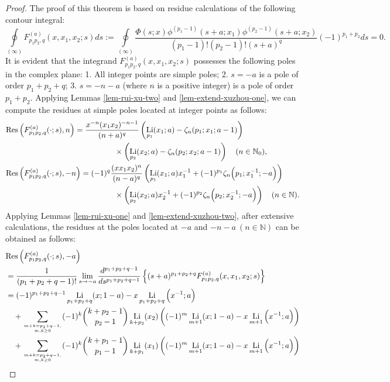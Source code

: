 \documentclass[11pt]{article}
\newcommand\Res{{\rm Res}}
\DeclareMathOperator{\Li}{Li}
\def\N{\mathbb{N}}
\theoremstyle{plain}
\theoremstyle{definition}
\begin{document}
\begin{proof}
The proof of this theorem is based on residue calculations of the following contour integral:
\[\oint\limits_{\left( \infty  \right)}F^{(a)}_{p_1p_2,q}(x,x_1,x_2;s)ds:= \oint\limits_{\left( \infty  \right)}\frac{\Phi(s;x)\phi^{(p_1-1)}(s+a;x_1)\phi^{(p_2-1)}(s+a;x_2)}{(p_1-1)!(p_2-1)!(s+a)^q} (-1)^{p_1+p_2}ds=0.\]
It is evident that the integrand $F^{(a)}_{p_1p_2,q}(x,x_1,x_2;s)$ possesses the following poles in the complex plane: 1. All integer points are simple poles; 2. $s=-a$ is a pole of order $p_1+p_2+q$; 3. $s=-n-a$ (where $n$ is a positive integer) is a pole of order $p_1+p_2$. Applying Lemmas \ref{lem-rui-xu-two} and \ref{lem-extend-xuzhou-one}, we can compute the residues at simple poles located at integer points as follows:
\begin{align*}
&\Res\left(F^{(a)}_{p_1p_2,q}(\cdot;s),n\right)=\frac{x^{-n}(x_1x_2)^{-n-1}}{(n+a)^q}\left(\Li_{p_1}(x_1;a)-\zeta_n(p_1;x_1;a-1)\right)
\\&\qquad\qquad\qquad\qquad\qquad\qquad\qquad\times\left(\Li_{p_2}(x_2;a)-\zeta_n(p_2;x_2;a-1)\right)\quad (n\in \N_0),\\
&\Res\left(F^{(a)}_{p_1p_2,q}(\cdot;s),-n\right)=(-1)^q \frac{(xx_1x_2)^n}{(n-a)^q}\left(\Li_{p_1}(x_1;a)x_1^{-1}+(-1)^{p_1}\zeta_n\Big(p_1;x_1^{-1};-a\Big)\right)\\&\qquad\qquad\qquad\qquad\qquad\qquad\qquad
\times\left(\Li_{p_2}(x_2;a)x_2^{-1}+(-1)^{p_2}\zeta_n\Big(p_2;x_2^{-1};-a\Big)\right)\quad (n\in \N).
\end{align*}
Applying Lemmas \ref{lem-rui-xu-one} and \ref{lem-extend-xuzhou-two}, after extensive calculations, the residues at the poles located at $-a$ and $-n - a\ (n\in \N)$ can be obtained as follows:
\begin{align*}
&\Res\left(F^{(a)}_{p_1p_2,q}(\cdot;s),-a\right)\\&=\frac{1}{(p_1+p_2+q-1)!}\lim_{s\rightarrow -a}\frac{d^{p_1+p_2+q-1}}{ds^{p_1+p_2+q-1}}\left\{(s+a)^{p_1+p_2+q}F_{p_1p_2,q}^{(a)}(x,x_1,x_2;s)\right\}\\
&=(-1)^{p_1+p_2+q-1}\Li_{p_1+p_2+q}(x;1-a)-x\Li_{p_1+p_2+q}\Big(x^{-1};a\Big)\\
&\quad+\sum_{m+k=p_1+q-1,\atop m,k\geq 0} (-1)^k \binom{k+p_2-1}{p_2-1}\Li_{k+p_2}(x_2)\left((-1)^m\Li_{m+1}(x;1-a)-x \Li_{m+1}\Big(x^{-1};a\Big)\right)\\
&\quad+\sum_{m+k=p_2+q-1,\atop m,k\geq 0} (-1)^k \binom{k+p_1-1}{p_1-1}\Li_{k+p_1}(x_1)\left((-1)^m\Li_{m+1}(x;1-a)-x \Li_{m+1}\Big(x^{-1};a\Big)\right)\\

\end{align*}
\end{proof}
\end{document}
